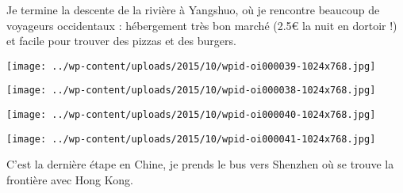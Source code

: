  Je termine la descente de la rivière à Yangshuo, où je rencontre beaucoup de voyageurs occidentaux : hébergement très bon marché (2.5€ la nuit en dortoir !) et facile pour trouver des pizzas et des burgers. 
\begin{center} \texttt{[image: ../wp-content/uploads/2015/10/wpid-oi000039-1024x768.jpg]} \end{center}
\begin{center} \texttt{[image: ../wp-content/uploads/2015/10/wpid-oi000038-1024x768.jpg]} \end{center}
\begin{center} \texttt{[image: ../wp-content/uploads/2015/10/wpid-oi000040-1024x768.jpg]} \end{center}
\begin{center} \texttt{[image: ../wp-content/uploads/2015/10/wpid-oi000041-1024x768.jpg]} \end{center}

 C'est la dernière étape en Chine, je prends le bus vers Shenzhen où se trouve la frontière avec Hong Kong.